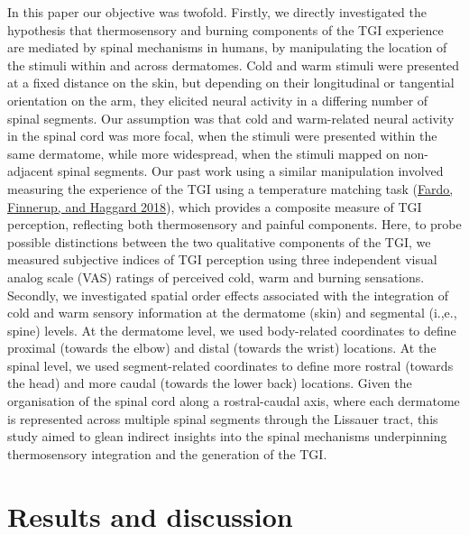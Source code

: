 \documentclass[
]{article}
\begin{document}
In this paper our objective was twofold. Firstly, we directly
investigated the hypothesis that thermosensory and burning components of
the TGI experience are mediated by spinal mechanisms in humans, by
manipulating the location of the stimuli within and across dermatomes.
Cold and warm stimuli were presented at a fixed distance on the skin,
but depending on their longitudinal or tangential orientation on the
arm, they elicited neural activity in a differing number of spinal
segments. Our assumption was that cold and warm-related neural activity
in the spinal cord was more focal, when the stimuli were presented
within the same dermatome, while more widespread, when the stimuli
mapped on non-adjacent spinal segments. Our past work using a similar
manipulation involved measuring the experience of the TGI using a
temperature matching task
(\protect\hyperlink{ref-fardo_organization_2018}{Fardo, Finnerup, and
Haggard 2018}), which provides a composite measure of TGI perception,
reflecting both thermosensory and painful components. Here, to probe
possible distinctions between the two qualitative components of the TGI,
we measured subjective indices of TGI perception using three independent
visual analog scale (VAS) ratings of perceived cold, warm and burning
sensations. Secondly, we investigated spatial order effects associated
with the integration of cold and warm sensory information at the
dermatome (skin) and segmental (i.,e., spine) levels. At the dermatome
level, we used body-related coordinates to define proximal (towards the
elbow) and distal (towards the wrist) locations. At the spinal level, we
used segment-related coordinates to define more rostral (towards the
head) and more caudal (towards the lower back) locations. Given the
organisation of the spinal cord along a rostral-caudal axis, where each
dermatome is represented across multiple spinal segments through the
Lissauer tract, this study aimed to glean indirect insights into the
spinal mechanisms underpinning thermosensory integration and the
generation of the TGI.

\newpage

\hypertarget{results-and-discussion}{%
\section{Results and discussion}\label{results-and-discussion}}
\end{document}
